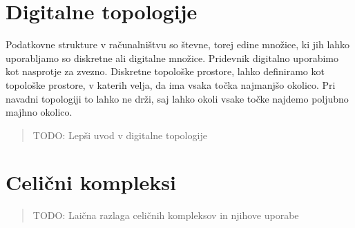 \documentclass[a4paper, 12pt]{book}
\theoremstyle{definition}
\begin{document}
\section{Digitalne topologije}
Podatkovne strukture v računalništvu so števne, torej edine množice, ki jih lahko
uporabljamo so diskretne ali digitalne množice. Pridevnik digitalno uporabimo kot
nasprotje za zvezno. Diskretne topološke prostore, lahko definiramo kot topološke prostore,
v katerih velja, da ima vsaka točka najmanjšo okolico. Pri navadni topologiji to
lahko ne drži, saj lahko okoli vsake točke najdemo poljubno majhno okolico. 
\begin{quote}
    TODO: Lepši uvod v digitalne topologije
\end{quote}

\section{Celični kompleksi}
\begin{quote}
    TODO: Laična razlaga celičnih kompleksov in njihove uporabe
\end{quote}
\end{document}
